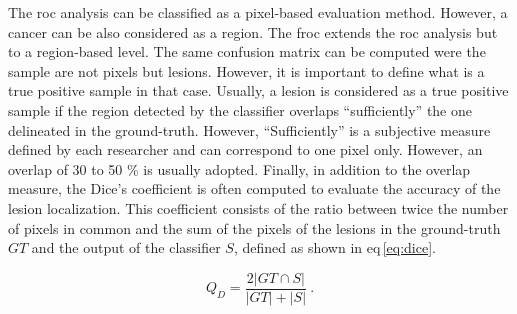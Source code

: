 The \ac{roc} analysis can be classified as a pixel-based evaluation method.
However, a cancer can be also considered as a region.
The \acf{froc} extends the \ac{roc} analysis but to a region-based level.
The same confusion matrix can be computed were the sample are not pixels but lesions.
However, it is important to define what is a true positive sample in that case.
Usually, a lesion is considered as a true positive sample if the region detected by the classifier overlaps ``sufficiently'' the one delineated in the ground-truth.
However, ``Sufficiently'' is a subjective measure defined by each researcher and can correspond to one pixel only.
However, an overlap of 30 to 50 \% is usually adopted.
Finally, in addition to the overlap measure, the Dice's coefficient is often computed to evaluate the accuracy of the lesion localization.
This coefficient consists of the ratio between twice the number of pixels in common and the sum of the pixels of the lesions in the ground-truth $GT$ and the output of the classifier $S$, defined as shown in \acs{eq}\,\eqref{eq:dice}.

\begin{equation}
  Q_D = \frac{2 | GT \cap S |}{| GT | + | S |} \ .
  \label{eq:dice}
\end{equation}
